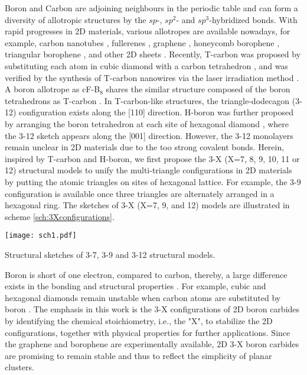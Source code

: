 \documentclass[journal=jpclcd,manuscript=article, layout=twocolumn]{achemso}
\begin{document}
\maketitle


	Boron and Carbon are adjoining neighbours in the periodic table and can form a diversity of allotropic structures by the $sp$-, $sp^2$- and $sp^3$-hybridized bonds. With rapid progresses in 2D materials, various allotropes are available nowadays, for example, carbon nanotubes \cite{1991-nature-nanotube}, fullerenes \cite{1985-nature-fullerene}, graphene \cite{2004-science-graphene}, honeycomb borophene \cite{h-bor}, triangular borophene \cite{t-bor}, and other 2D sheets \cite{exp-2d-B-nc,the-2d-b-1,the-2d-b-2}. Recently, T-carbon was proposed by substituting each atom in cubic diamond with a carbon tetrahedron \cite{2011-PRL-Tcarbon}, and was verified by the synthesis of T-carbon nanowires via the laser irradiation method \cite{2017-NC-T-carbon-exp}. A boron allotrope as cF-B$_8$ shares the similar structure composed of the boron tetrahedrons as T-carbon \cite{T-boron-the}. In T-carbon-like structures, the triangle-dodecagon (3-12) configuration exists along the [110] direction. H-boron was further proposed by arranging the boron tetrahedron at each site of hexagonal diamond \cite{2019-PRM-Hboron,2021-JPCL-Hboron}, where the 3-12 sketch appears along the [001] direction. However, the 3-12 monolayers remain unclear in 2D materials due to the too strong covalent bonds. Herein, inspired by T-carbon and H-boron, we first propose the 3-X (X=7, 8, 9, 10, 11 or 12) structural models to unify the multi-triangle configurations in 2D materials by putting the atomic triangles on sites of hexagonal lattice. For example, the 3-9 configuration is available once three triangles are alternately arranged in a hexagonal ring. The sketches of 3-X (X=7, 9, and 12) models are illustrated in scheme \ref{sch:3Xconfigurations}.
	
	\begin{scheme}[b]
		\centering
		\texttt{[image: sch1.pdf]}
		\caption{Structural sketches of 3-7, 3-9 and 3-12 structural models.}
		\label{sch:3Xconfigurations}
	\end{scheme}

	Boron is short of one electron, compared to carbon, thereby, a large difference exists in the bonding and structural properties \cite{2014-JPCL-porousBN,2020-JPCL-BCN,2021-JPCL-BCP}. For example, cubic and hexagonal diamonds remain unstable when carbon atoms are substituted by boron \cite{2019-PRM-Hboron}. The emphasis in this work is the 3-X configurations of 2D boron carbides by identifying the chemical stoichiometry, i.e., the "X", to stabilize the 2D configurations, together with physical properties for further applications. Since the graphene and borophene are experimentally available, 2D 3-X boron carbides are promising to remain stable and thus to reflect the simplicity of planar clusters.
	
\end{document}
